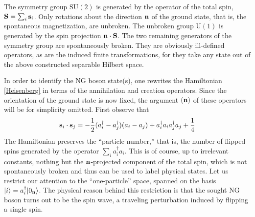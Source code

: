\documentclass[final,3p,times,12pt,a4paper,sort&compress]{elsarticle}
\newcommand\gr[1]{\mathrm{#1}}              %
\newcommand\vek[1]{{\boldsymbol{\bf #1}}}   %
\newcommand\skal[2]{\vek{#1}\cdot\vek{#2}}  %
\newcommand\ket[1]{\vert#1\rangle}          %
\newcommand\he[1]{#1^{\dagger}}             %
\begin{document}
The symmetry group $\gr{SU(2)}$ is generated by the operator of the total spin,
$\vek S=\sum_i\vek s_i$. Only rotations about the direction $\vek n$ of the
ground state, that is, the spontaneous magnetization, are unbroken. The
unbroken group $\gr{U(1)}$ is generated by the spin projection $\skal nS$. The
two remaining generators of the symmetry group are spontaneously broken. They
are obviously ill-defined operators, as are the induced finite transformations,
for they take any state out of the above constructed separable Hilbert space.

In order to identify the NG boson state(s), one rewrites the Hamiltonian
\eqref{Heisenberg} in terms of the annihilation and creation operators. Since
the orientation of the ground state is now fixed, the argument $(\vek n)$ of
these operators will be for simplicity omitted. First observe that
\begin{equation}
\vek s_i\cdot\vek s_j=-\frac12(\he a_i-\he a_j)(a_i-a_j)+\he a_ia_i\he
a_ja_j+\frac14
\label{Heis_Ham_second_quantization}
\end{equation}
The Hamiltonian preserves the ``particle number,'' that is, the number of
flipped spins generated by the operator $\sum_i\he a_ia_i$. This is of course,
up to irrelevant constants, nothing but the $\vek n$-projected component of the
total spin, which is not spontaneously broken and thus can be used to label
physical states. Let us restrict our attention to the ``one-particle'' space,
spanned on the basis $\ket i=\he a_i\ket{0_{\vek n}}$. The physical reason
behind this restriction is that the sought NG boson turns out to be the spin
wave, a traveling perturbation induced by flipping a single spin.
\end{document}
